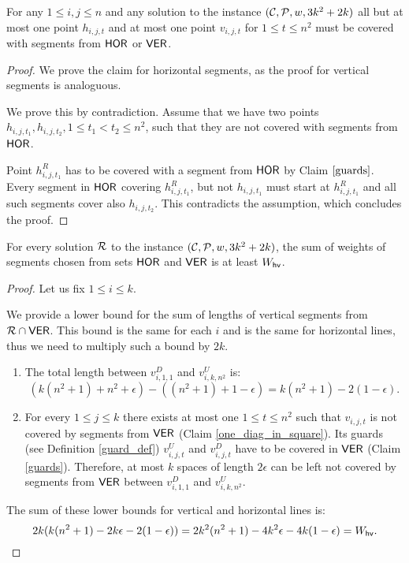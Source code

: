 \begin{claim}
\label{one_diag_in_square}
For any $1 \le i, j \le n$
and any solution to the instance $(\mathcal{C}, \mathcal{P}, w, 3k^2+2k)$
all but at most one point $h_{i, j, t}$
and at most one point $v_{i, j, t}$
for $1 \le t \le n^2$
must be
covered with segments from $\mathsf{HOR}$ or $\mathsf{VER}$.
\end{claim}

\begin{proof}
We prove the claim for horizontal segments,
as the proof for vertical segments is analoguous.

We prove this by contradiction. Assume that we
have two points $h_{i,j,t_1}, h_{i,j,t_2},1 \le t_1 <  t_2 \le n^2$,
such that they are not covered with segments from $\mathsf{HOR}$.

Point $h^R_{i, j, t_1}$ has to be covered with a segment from $\mathsf{HOR}$
by Claim $\ref{guards}$.
Every segment in $\mathsf{HOR}$ covering $h^R_{i, j, t_1}$,
but not $h_{i,j,t_1}$ must start at $h^R_{i, j, t_1}$
and all such segments cover also $h_{i, j, t_2}$.
This contradicts the assumption, which concludes the proof.
\end{proof}

\begin{lemma}
\label{vertical_horizontal_sum}
For every solution $\mathcal{R}$ to the instance $(\mathcal{C}, \mathcal{P}, w, 3k^2+2k)$,
the sum of weights of segments chosen
from sets $\mathsf{HOR}$ and $\mathsf{VER}$ is at least
$W_{\mathsf{hv}}$.
\end{lemma}

\begin{proof}
Let us fix $1 \le i \le k$.

We provide a lower bound for the sum of lengths
of vertical segments from $\mathcal{R} \cap \mathsf{VER}$.
This bound is the same for each $i$ and is the same
for horizontal lines, thus we need to multiply such a bound by $2k$.

\begin{enumerate}[label={(\arabic*)}]
\item The total length between $v^D_{i, 1, 1}$ and $v^U_{i, k, n^2}$ is:
$$(k(n^2+1) + n^2 +\epsilon) - ((n^2+1)+1 -\epsilon) = k(n^2+1) - 2(1 - \epsilon).$$

\item For every $1 \le j \le k$ there exists at most one $1 \le t \le n^2$
such that $v_{i,j,t}$ is not covered by segments from $\mathsf{VER}$
(Claim \ref{one_diag_in_square}).
Its guards (see Definition \ref{guard_def}) $v^U_{i,j,t}$ and $v^D_{i,j,t}$
have to be covered in $\mathsf{VER}$ (Claim \ref{guards}).
Therefore, at most $k$ spaces of length $2\epsilon$ can be left
not covered by segments from $\mathsf{VER}$ between $v_{i,1,1}^D$ and $v_{i,k,n^2}^U$.

\end{enumerate}
The sum of these lower bounds for vertical and horizontal lines is:
$$2k(k(n^2+1) -2k\epsilon -2(1-\epsilon)) = 2k^2(n^2+1) -4k^2\epsilon -4k(1-\epsilon) = W_{\mathsf{hv}}.$$
\end{proof}

